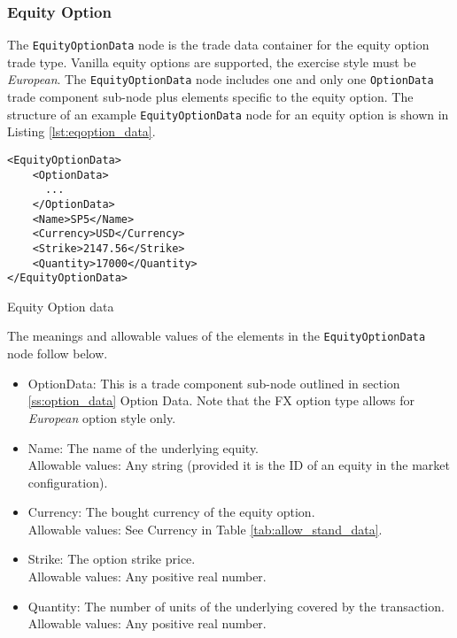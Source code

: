 \subsubsection{Equity Option}

The \lstinline!EquityOptionData!  node is the trade data container for the equity option trade type.  Vanilla equity 
options are supported, the exercise style must be \emph{European}. The \lstinline!EquityOptionData!  node includes one and 
only one \lstinline!OptionData! trade component sub-node plus elements specific to the equity option. The structure of 
an example \lstinline!EquityOptionData! node for an equity option is shown in Listing
\ref{lst:eqoption_data}.

\begin{listing}[H]
\begin{verbatim}
<EquityOptionData>
    <OptionData>
      ...
    </OptionData>
    <Name>SP5</Name>
    <Currency>USD</Currency>
    <Strike>2147.56</Strike>
    <Quantity>17000</Quantity>
</EquityOptionData>
\end{verbatim}
\caption{Equity Option data}
\label{lst:eqoption_data}
\end{listing}

The meanings and allowable values of the elements in the \lstinline!EquityOptionData!  node follow below.

\begin{itemize}
	\item OptionData: This is a trade component sub-node outlined in section \ref{ss:option_data} Option Data. Note 
	that the FX option type allows for \emph{European} option style only.	
	\item Name: The name of the underlying equity. \\
	Allowable values:  Any string (provided it is the ID of an equity in the market configuration).
	\item Currency: The bought currency of the equity option. \\
	Allowable values:  See Currency in Table \ref{tab:allow_stand_data}.	
	\item Strike: The option strike price.\\
	Allowable values:  Any positive real number.	
	\item Quantity: The number of units of the underlying covered by the transaction. \\
	Allowable values:  Any positive real number.
\end{itemize}

